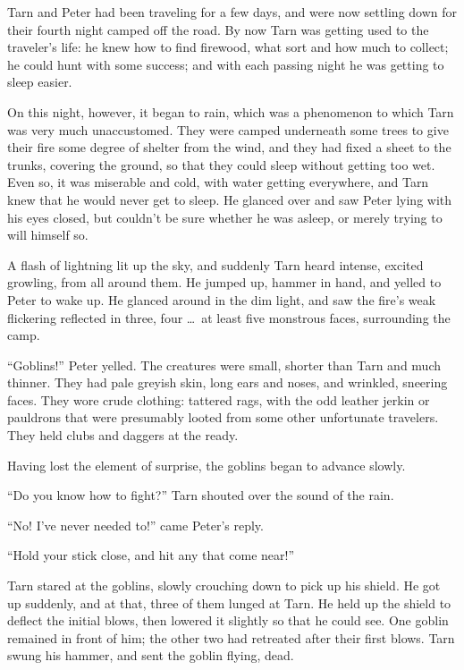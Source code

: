 \divider
Tarn and Peter had been traveling for a few days, and were now settling down for their fourth night camped off the road.  By now Tarn was getting used to the traveler's life: he knew how to find firewood, what sort and how much to collect; he could hunt with some success; and with each passing night he was getting to sleep easier.

On this night, however, it began to rain, which was a phenomenon to which Tarn was very much unaccustomed.  They were camped underneath some trees to give their fire some degree of shelter from the wind, and they had fixed a sheet to the trunks, covering the ground, so that they could sleep without getting too wet.  Even so, it was miserable and cold, with water getting everywhere, and Tarn knew that he would never get to sleep.  He glanced over and saw Peter lying with his eyes closed, but couldn't be sure whether he was asleep, or merely trying to will himself so.

A flash of lightning lit up the sky, and suddenly Tarn heard intense, excited growling, from all around them.  He jumped up, hammer in hand, and yelled to Peter to wake up.  He glanced around in the dim light, and saw the fire's weak flickering reflected in three, four \ldots\  at least five monstrous faces, surrounding the camp.

``Goblins!'' Peter yelled.  The creatures were small, shorter than Tarn and much thinner.  They had pale greyish skin, long ears and noses, and wrinkled, sneering faces.  They wore crude clothing: tattered rags, with the odd leather jerkin or pauldrons that were presumably looted from some other unfortunate travelers.  They held clubs and daggers at the ready.

Having lost the element of surprise, the goblins began to advance slowly.

``Do you know how to fight?'' Tarn shouted over the sound of the rain.

``No!  I've never needed to!'' came Peter's reply.

``Hold your stick close, and hit any that come near!''

Tarn stared at the goblins, slowly crouching down to pick up his shield.  He got up suddenly, and at that, three of them lunged at Tarn.  He held up the shield to deflect the initial blows, then lowered it slightly so that he could see.  One goblin remained in front of him; the other two had retreated after their first blows.  Tarn swung his hammer, and sent the goblin flying, dead.


